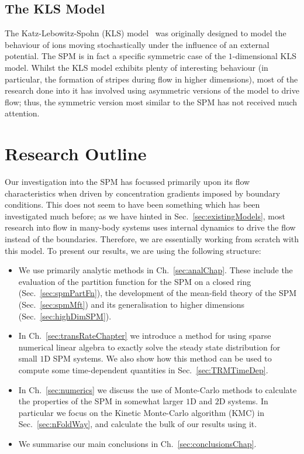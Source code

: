 \subsection{The KLS Model}
The Katz-Lebowitz-Spohn (KLS) model~\cite{Katz1984, Zia2010} was originally designed to model the
behaviour of ions moving stochastically
under the influence of an external potential. The SPM is in fact a specific symmetric case of the
$1$-dimensional KLS model. Whilst the KLS model exhibits plenty of interesting behaviour
(in particular, the formation of stripes during flow in higher dimensions), most of the research done
into it has involved using asymmetric versions of the model to drive flow; thus, the symmetric version
most similar to the SPM has not received much attention.

\section{Research Outline}
Our investigation into the SPM has focussed primarily upon its flow characteristics when driven
by concentration gradients imposed by boundary conditions. This does not seem to have been something
which has been investigated much before; as we have hinted in Sec.~\ref{sec:existingModels}, most
research into flow in many-body systems uses internal dynamics to drive the flow instead of the 
boundaries. Therefore, we are essentially working from scratch with this model.
To present our results, we are using the following structure:
\begin{itemize}
 \item We use primarily analytic methods in Ch.~\ref{sec:analChap}. These include the evaluation
 of the partition function for the SPM on a closed ring (Sec.~\ref{sec:spmPartFn}), the development
 of the mean-field theory of the SPM (Sec.~\ref{sec:spmMft}) and its generalisation to higher dimensions
 (Sec.~\ref{sec:highDimSPM}).
 \item In Ch.~\ref{sec:transRateChapter} we introduce a method for using sparse numerical linear
 algebra to exactly solve the steady state distribution for small $1$D SPM systems. We also show how this
 method can be used to compute some time-dependent quantities in Sec.~\ref{sec:TRMTimeDep}.
 \item In Ch.~\ref{sec:numerics} we discuss the use of Monte-Carlo methods to calculate the properties
 of the SPM in somewhat larger $1$D and $2$D systems. In particular we focus on the Kinetic
  Monte-Carlo algorithm (KMC) in Sec.~\ref{sec:nFoldWay}, and calculate the bulk of our results
  using it.
\item We summarise our main conclusions in Ch.~\ref{sec:conclusionsChap}.
\end{itemize}


